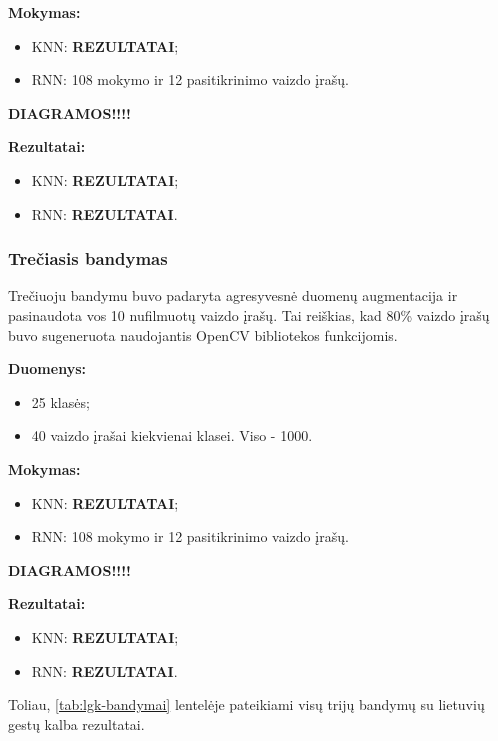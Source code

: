\documentclass{VUMIFPSbakalaurinis}
\begin{document}
\textbf{Mokymas:}
\begin{itemize}
	\item KNN: \textbf{REZULTATAI};
	\item RNN: 108 mokymo ir 12 pasitikrinimo vaizdo įrašų.
\end{itemize}

\textbf{DIAGRAMOS!!!!}

\textbf{Rezultatai:}
\begin{itemize}
	\item KNN: \textbf{REZULTATAI};
	\item RNN: \textbf{REZULTATAI}.
\end{itemize}

\subsubsection{Trečiasis bandymas}

Trečiuoju bandymu buvo padaryta agresyvesnė duomenų augmentacija ir pasinaudota vos 10 nufilmuotų vaizdo įrašų. Tai reiškias, kad 80\% vaizdo įrašų buvo sugeneruota naudojantis OpenCV bibliotekos funkcijomis.

\textbf{Duomenys:}
\begin{itemize}
	\item 25 klasės;
	\item 40 vaizdo įrašai kiekvienai klasei. Viso - 1000.
\end{itemize}

\textbf{Mokymas:}
\begin{itemize}
	\item KNN: \textbf{REZULTATAI};
	\item RNN: 108 mokymo ir 12 pasitikrinimo vaizdo įrašų.
\end{itemize}

\textbf{DIAGRAMOS!!!!}

\textbf{Rezultatai:}
\begin{itemize}
	\item KNN: \textbf{REZULTATAI};
	\item RNN: \textbf{REZULTATAI}.
\end{itemize}

Toliau, \ref{tab:lgk-bandymai} lentelėje pateikiami visų trijų bandymų su lietuvių gestų kalba rezultatai.
\end{document}
